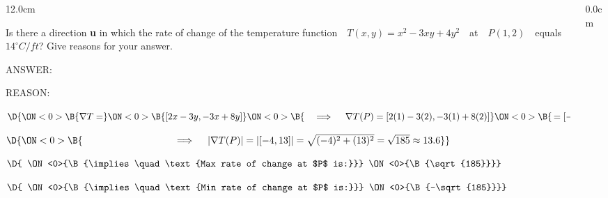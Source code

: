 \begin{frame}
\begin{columns}\begin{column}{12.0cm}

\vspace{0.1cm}

\scriptsize	

\EX Is there a direction {\bf u} in which the rate of change of the temperature function \,\, $T(x,y) = x^2 - 3xy + 4y^2$ \,\, at \,\, $P(1, 2)$ \,\,  equals \,\,  $14^{\circ} C/ft$? Give reasons for your answer.
	
	\vspace{0.2cm}
	
ANSWER: 

\vspace{0.2cm}

REASON: 

\vspace{0.2cm}

$\D{
\ON<0>{\B{\nabla T = }}
\ON<0>{\B{[2x-3y,-3x+8y]}}
\ON<0>{\B{ \quad \implies \quad \nabla T(P) = [2(1)-3(2),-3(1)+8(2)]}}
\ON<0>{\B{\,= [-4,13]}}
}$

\vspace{0.2cm}

$\D{
\ON<0>{\B{ \hspace{2.6cm} \qquad \implies \quad |\nabla T(P)| = |[-4,13]| = \sqrt{(-4)^2 + (13)^2} = \sqrt{185} \approx 13.6}}
}$

\vspace{0.5cm}

$\D{
\ON<0>{\B{\implies \quad \text{Max rate of change at $P$ is:}}}
\ON<0>{\B{\sqrt{185}}}}$

\vspace{0.5cm}

$\D{
\ON<0>{\B{\implies \quad \text{Min rate of change at $P$ is:}}}
\ON<0>{\B{-\sqrt{185}}}}$

\vspace{0.5cm}



\vspace{4.2cm}

\end{column}\begin{column}{0.0cm}\end{column}\end{columns}
\end{frame}


